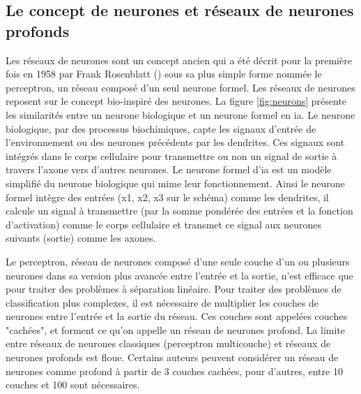 \subsection{Le concept de neurones et réseaux de neurones profonds}
Les réseaux de neurones sont un concept ancien qui a été décrit pour la première fois en 1958 par Frank Rosenblatt (\cite{rosenblatt_perceptron_1958}) sous sa plus simple forme nommée le perceptron, un réseau composé d'un seul neurone formel. Les réseaux de neurones reposent sur le concept bio-inspiré des neurones. La figure \ref{fig:neurons} présente les similarités entre un neurone biologique et un neurone formel en \gls{ia}. Le neurone biologique, par des processus biochimiques, capte les signaux d'entrée de l'environnement ou des neurones précédents par les dendrites. Ces signaux sont intégrés dans le corps cellulaire pour transmettre ou non un signal de sortie à travers l'axone vers d'autres neurones. Le neurone formel d'\gls{ia} est un modèle simplifié du neurone biologique qui mime leur fonctionnement. Ainsi le neurone formel intègre des entrées (x1, x2, x3 sur le schéma) comme les dendrites, il calcule un signal à transmettre (par la somme pondérée des entrées et la fonction d'activation) comme le corps cellulaire et transmet ce signal aux neurones suivants (sortie) comme les axones.


Le perceptron, réseau de neurones composé d'une seule couche d’un ou plusieurs neurones dans sa version plus avancée entre l'entrée et la sortie, n'est efficace que pour traiter des problèmes à séparation linéaire. Pour traiter des problèmes de classification plus complexes, il est nécessaire de multiplier les couches de neurones entre l'entrée et la sortie du réseau. Ces couches sont appelées couches "cachées", et forment ce qu'on appelle un réseau de neurones profond. La limite entre réseaux de neurones classiques (perceptron multicouche) et réseaux de neurones profonds est floue. Certains auteurs peuvent considérer un réseau de neurones comme profond à partir de 3 couches cachées, pour d'autres, entre 10 couches et 100 sont nécessaires.


